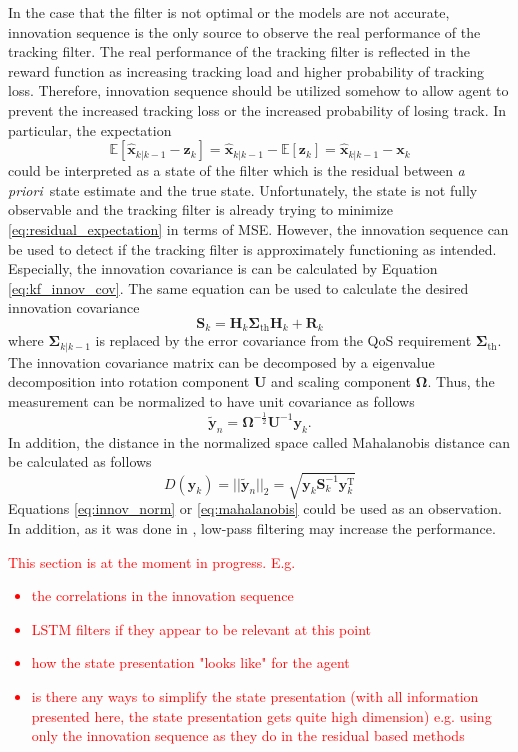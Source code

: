 \documentclass[english, 12pt, a4paper, elec, utf8, a-1b, online]{aaltothesis}
\renewcommand{\vec}[1]{\mathbf{#1}}
\newcommand{\E}[1]{\mathbb{E}\left[ #1 \right]}
\newcommand{\inv}[1]{#1^{-1}}
\newcommand{\xprior}{\hat{\vec{x}}_{k|k-1}}
\newcommand{\priorecov}{\boldsymbol{\Sigma}_{k|k-1}}
\newcommand{\prefitinnov}{\vec{y}_k}
\newcommand{\x}{\vec{x}_k}
\newcommand{\z}{\vec{z}_k}
\newcommand{\omodel}{\vec{H}_k}
\newcommand{\ocov}{\vec{R}_k}
\newcommand{\innocov}{\vec{S}_k}
\newcommand{\transpose}[1]{#1^\text{T}}
\newcommand{\priorecovth}{\bm{\Sigma}_{\text{th}}}
\def\prior{\textit{a priori}\ }
\begin{document}
In the case that the filter is not optimal or the models are not accurate, innovation sequence is the only source to observe the real performance of the tracking filter.
The real performance of the tracking filter is reflected in the reward function as increasing tracking load and higher probability of tracking loss.
Therefore, innovation sequence should be utilized somehow to allow agent to prevent the increased tracking loss or the increased probability of losing track.
In particular, the expectation
\begin{equation} \label{eq:residual_expectation}
    \E{\xprior - \z} = \xprior - \E{\z} = \xprior - \x
\end{equation}
could be interpreted as a state of the filter which is the residual between \prior state estimate and the true state.
Unfortunately, the state is not fully observable and the tracking filter is already trying to minimize \eqref{eq:residual_expectation} in terms of MSE.
However, the innovation sequence can be used to detect if the tracking filter is approximately functioning as intended.
Especially, the innovation covariance is can be calculated by Equation \eqref{eq:kf_innov_cov}.
The same equation can be used to calculate the desired innovation covariance
\begin{equation}
    \innocov = \omodel \priorecovth \omodel + \ocov
\end{equation}
where $\priorecov$ is replaced by the error covariance from the QoS requirement $\priorecovth$.
The innovation covariance matrix can be decomposed by a eigenvalue decomposition into rotation component $\vec{U}$ and scaling component $\bm{\Omega}$.   
Thus, the measurement can be normalized to have unit covariance as follows 
\begin{equation}\label{eq:innov_norm}
    \tilde{\vec{y}}_n = \bm{\Omega}^{-\frac{1}{2}} \inv{\vec{U}}\prefitinnov.
\end{equation}
In addition, the distance in the normalized space called Mahalanobis distance can be calculated as follows
\begin{equation}\label{eq:mahalanobis}
    D(\prefitinnov) = || \tilde{\vec{y}}_n ||_2 = \sqrt{\prefitinnov \innocov^{-1} \transpose{\prefitinnov}}
\end{equation}
Equations \eqref{eq:innov_norm} or \eqref{eq:mahalanobis} could be used as an observation.
In addition, as it was done in \cite{Gardner1988}, low-pass filtering may increase the performance. 

\textcolor{red}{This section is at the moment in progress. E.g. 
\begin{itemize}
    \item the correlations in the innovation sequence
    \item LSTM filters if they appear to be relevant at this point
    \item how the state presentation "looks like" for the agent
    \item is there any ways to simplify the state presentation (with all information presented here, the state presentation gets quite high dimension) e.g. using only the innovation sequence as they do in the residual based methods
\end{itemize}
}
\end{document}
